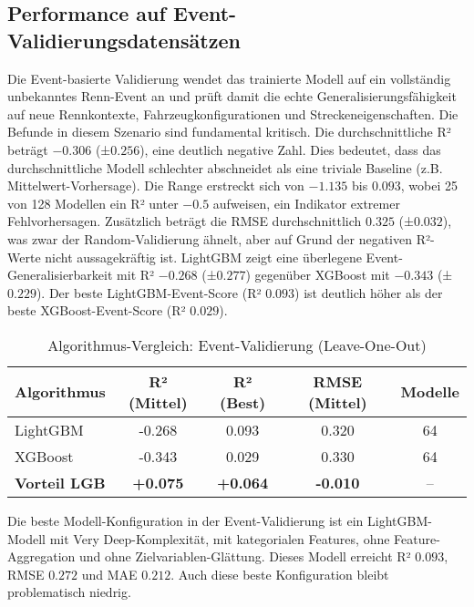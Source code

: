 \subsection{Performance auf Event-Validierungsdatensätzen}

Die Event-basierte Validierung wendet das trainierte Modell auf ein vollständig unbekanntes Renn-Event an und prüft damit die echte Generalisierungsfähigkeit auf neue Rennkontexte, Fahrzeugkonfigurationen und Streckeneigenschaften. Die Befunde in diesem Szenario sind fundamental kritisch. Die durchschnittliche R² beträgt $-0.306$ (±$0.256$), eine deutlich negative Zahl. Dies bedeutet, dass das durchschnittliche Modell schlechter abschneidet als eine triviale Baseline (z.B. Mittelwert-Vorhersage). Die Range erstreckt sich von $-1.135$ bis $0.093$, wobei 25 von 128 Modellen ein R² unter $-0.5$ aufweisen, ein Indikator extremer Fehlvorhersagen. Zusätzlich beträgt die RMSE durchschnittlich $0.325$ (±$0.032$), was zwar der Random-Validierung ähnelt, aber auf Grund der negativen R²-Werte nicht aussagekräftig ist. LightGBM zeigt eine überlegene Event-Generalisierbarkeit mit R² $-0.268$ (±$0.277$) gegenüber XGBoost mit $-0.343$ (±$0.229$). Der beste LightGBM-Event-Score (R² $0.093$) ist deutlich höher als der beste XGBoost-Event-Score (R² $0.029$).

\begin{table}[H]
  \centering
  \begin{tabular}{lcccc}
    \toprule
    \textbf{Algorithmus} & \textbf{R² (Mittel)} & \textbf{R² (Best)} & \textbf{RMSE (Mittel)} & \textbf{Modelle} \\
    \midrule
    LightGBM & -0.268 & 0.093 & 0.320 & 64 \\
    XGBoost & -0.343 & 0.029 & 0.330 & 64 \\
    \midrule
    \textbf{Vorteil LGB} & \textbf{+0.075} & \textbf{+0.064} & \textbf{-0.010} & -- \\
    \bottomrule
  \end{tabular}
  \caption{Algorithmus-Vergleich: Event-Validierung (Leave-One-Out)}
  \label{tab:algo_event}
\end{table}

Die beste Modell-Konfiguration in der Event-Validierung ist ein LightGBM-Modell mit Very Deep-Komplexität, mit kategorialen Features, ohne Feature-Aggregation und ohne Zielvariablen-Glättung. Dieses Modell erreicht R² $0.093$, RMSE $0.272$ und MAE $0.212$. Auch diese beste Konfiguration bleibt problematisch niedrig.

